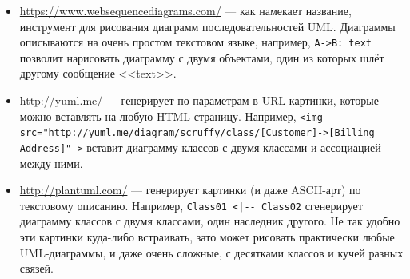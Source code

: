\documentclass[a5paper]{article}
\begin{document}
\begin{itemize}
    \begin{itemize}
        \item \url{https://www.websequencediagrams.com/} --- как намекает название, инструмент для рисования диаграмм последовательностей UML. Диаграммы описываются на очень простом текстовом языке, например, \verb|A->B: text| позволит нарисовать диаграмму с двумя объектами, один из которых шлёт другому сообщение <<text>>.
        \item \url{http://yuml.me/} --- генерирует по параметрам в URL картинки, которые можно вставлять на любую HTML-страницу. Например, \verb|<img src="http://yuml.me/diagram/scruffy/class/[Customer]->[Billing Address]" >| вставит диаграмму классов с двумя классами и ассоциацией между ними.
        \item \url{http://plantuml.com/} --- генерирует картинки (и даже ASCII-арт) по текстовому описанию. Например, \verb&Class01 <|-- Class02& сгенерирует диаграмму классов с двумя классами, один наследник другого. Не так удобно эти картинки куда-либо встраивать, зато может рисовать практически любые UML-диаграммы, и даже очень сложные, с десятками классов и кучей разных связей.
    \end{itemize}
\end{itemize}
\end{document}
